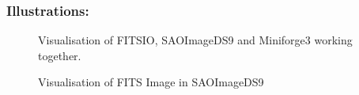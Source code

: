 \documentclass[a4paper,oneside,11pt]{book}
\begin{document}
\subsubsection{Illustrations:}
\begin{figure}[h]
    \centering
    \caption{Visualisation of FITSIO, SAOImageDS9 and Miniforge3 working together.}
\end{figure}
\clearpage
\begin{figure}[h]
    \centering
    \caption{Visualisation of FITS Image in SAOImageDS9 \citep{sanders2011how}}
\end{figure}
\clearpage
\end{document}
